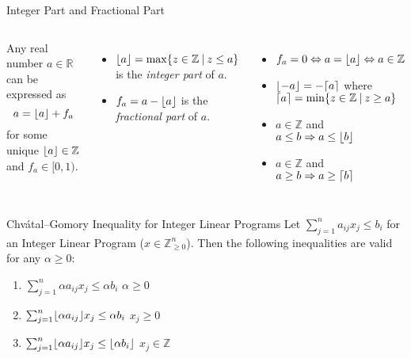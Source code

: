 \begin{frame}{Integer Part and Fractional Part}
\begin{columns}

Any real number $a \in \mathbb{R}$ can be expressed as
\begin{equation*}
a = \lfloor a\rfloor + f_a
\end{equation*}
for some unique $\lfloor a\rfloor \in \mathbb{Z}$ and $f_a \in [0,1)$.
\begin{itemize}
\item $\lfloor a\rfloor = \max\{z \in \mathbb{Z} \:\vert\: z \leq a\}$ is the\newline
\emph{integer part} of $a$.
\item $f_a = a - \lfloor a\rfloor$ is the\newline
\emph{fractional part} of $a$.
\end{itemize}


\begin{itemize}[<+(1)->]
	\item $f_a = 0 \Leftrightarrow a=\lfloor a\rfloor \Leftrightarrow a \in \mathbb{Z}$
	\item $\lfloor-a\rfloor = -\lceil a\rceil$ where $\lceil a\rceil = \min\{z \in \mathbb{Z} \:\vert\: z \geq a\}$
	\item $a \in \mathbb{Z}$ and $a \leq b \Rightarrow a \leq \lfloor b\rfloor$
	\item $a \in \mathbb{Z}$ and $a \geq b \Rightarrow a \geq \lceil b\rceil$
	\end{itemize}

\end{columns}
\end{frame}

\begin{frame}{Chvátal–Gomory Inequality for Integer Linear Programs}
Let $\sum_{j=1}^n a_{ij} x_j \leq b_i$ for an Integer Linear Program ($x \in \mathbb{Z}_{\geq 0}^n$).
Then the following inequalities are valid for any $\alpha \geq 0$:
\begin{enumerate}
	\item $\sum_{j=1}^n \alpha a_{ij} x_j \leq \alpha b_i$ \hfill $\alpha \geq 0$
	\item $\sum_{j=1}^n \lfloor\alpha a_{ij}\rfloor x_j \leq \alpha b_i$ \hfill $x_j \geq 0$
	\item $\sum_{j=1}^n \lfloor\alpha a_{ij}\rfloor x_j \leq \lfloor \alpha b_i\rfloor$ \hfill $x_j \in \mathbb{Z}$
\end{enumerate}

\end{frame}

